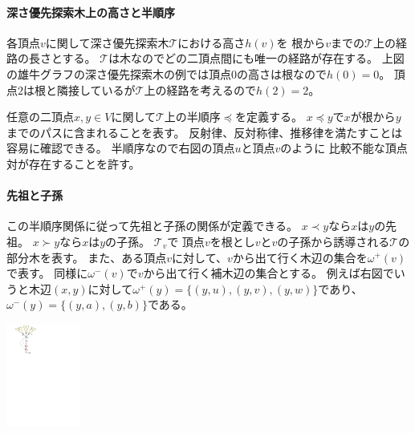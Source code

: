 \paragraph{深さ優先探索木上の高さと半順序}
各頂点$v$に関して深さ優先探索木${\mathcal T}$における高さ$h(v)$を
根から$v$までの${\mathcal T}$上の経路の長さとする。
${\mathcal T}$は木なのでどの二頂点間にも唯一の経路が存在する。
上図の雄牛グラフの深さ優先探索木の例では頂点$0$の高さは根なので$h(0)=0$。
頂点$2$は根と隣接しているが${\mathcal T}$上の経路を考えるので$h(2)=2$。


\begin{paracol}{2}

任意の二頂点$x, y \in V$に関して${\mathcal T}$上の半順序$\preceq$を定義する。
$x \preceq y$で$x$が根から$y$までのパスに含まれることを表す。
反射律、反対称律、推移律を満たすことは容易に確認できる。
半順序なので右図の頂点$u$と頂点$v$のように
比較不能な頂点対が存在することを許す。



\paragraph{先祖と子孫}
この半順序関係に従って先祖と子孫の関係が定義できる。
$x \prec y$なら$x$は$y$の先祖。
$x \succ y$なら$x$は$y$の子孫。
${\mathcal T}_v$で
頂点$v$を根とし$v$と$v$の子孫から誘導される${\mathcal T}$の部分木を表す。
また、ある頂点$v$に対して、$v$から出て行く木辺の集合を$\omega^+(v)$で表す。
同様に$\omega^-(v)$で$v$から出て行く補木辺の集合とする。
例えば右図でいうと木辺$(x, y)$に対して$\omega^+(y)=\{(y, u), (y, v), (y, w)\}$であり、
$\omega^-(y)=\{(y, a), (y, b)\}$である。



\switchcolumn
\vspace{.5\intextsep}
\centering
\includegraphics[width=0.18\textwidth]{figures/omegas.pdf}
\end{paracol}




